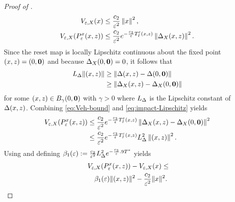 \documentclass[twocolumn]{article}
\begin{document}
\begin{proof} [Proof of ]
\begin{align}
    V_{\varepsilon, X}(x) &\leq \frac{c_{2}}{\varepsilon^{2}} \left\| x \right\|^{2},\\
    \nonumber
    V_{\varepsilon, X}(P_{\varepsilon}^{x}(x, z)) &\leq \frac{c_{2}}{\varepsilon^{2}} e^{-\frac{c_{3}}{\varepsilon} T_{I}^{\varepsilon}(x, z)} \left\| \Delta_{X}(x, z) \right\|^{2}.
  \end{align}
  Since the reset map is locally Lipschitz continuous about the fixed point $(x, z) = (0, {\mathbf 0})$ and because $\Delta_{X}(0, {\mathbf 0}) = 0$, it follows that
  \begin{align}
    \label{eq:impact-Lipschitz}
    L_{\Delta} \|(x, z)\| &\geq \| \Delta(x, z) - \Delta(0, {\mathbf 0}) \|\\
    \nonumber
    &\geq \| \Delta_{X}(x, z) - \Delta_{X}(0, {\mathbf 0}) \|
  \end{align}
  for some $(x, z) \in B_{\gamma}(0, {\mathbf 0})$ with $\gamma > 0$ where $L_{\Delta}$ is the Lipschitz constant of $\Delta(x, z)$.
  Combining \eqref{eq:Veh-bound} and \eqref{eq:impact-Lipschitz} yields
  \begin{align}
    \nonumber
    V_{\varepsilon, X}(P_{\varepsilon}^{x}(x, z)) &\leq \frac{c_{2}}{\varepsilon^{2}} e^{-\frac{c_{3}}{\varepsilon} T_{I}^{\varepsilon}(x, z)} \left\| \Delta_{X}(x, z) - \Delta_{X}(0, {\mathbf 0}) \right\|^{2}\\
    &\leq \frac{c_{2}}{\varepsilon^{2}} e^{-\frac{c_{3}}{\varepsilon} T_{I}^{\varepsilon}(x, z)} L_{\Delta}^{2} \left\| (x, z) \right\|^{2}.
  \end{align}
  Using  and defining $\beta_{1}(\varepsilon) := \frac{c_{2}}{\varepsilon^{2}} L_{\Delta}^{2} e^{-\frac{c_{3}}{\varepsilon} .9 T^{*}}$ yields
  \begin{align}
    \label{eq:DVeX-bounds}
    \lefteqn{\Vex(\Pex\argsxz) - \Vex(\zdx) \leq}\\
    \nonumber
    &&\bepsone \nzdxz^{2} - \frac{c_{2}}{\resclfparam^{2}} \nzdx^{2}.
  \end{align}


\end{proof}
\end{document}
